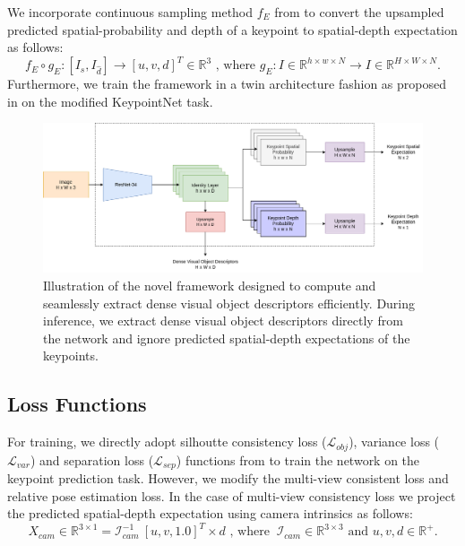 We incorporate continuous sampling method $f_E$ from \parencites{florence2020dense}{suwajanakorn2018discovery}
to convert the upsampled predicted spatial-probability and depth of a keypoint to spatial-depth expectation as follows:
\begin{equation}
    f_E \circ g_E:[I_s, I_{\hat{d}}] \rightarrow [u, v, d]^T \in \mathbb{R}^3 \text{ , where }  g_E: I \in \mathbb{R}^{h \times w \times N} \rightarrow I \in \mathbb{R}^{H \times W \times N}.
\end{equation}
Furthermore, we train the framework in a twin architecture fashion as proposed in
\parencites{chen2020simple}{zbontar2021barlow}{florence2018dense}{florence2020dense}{kupcsik2021supervised}{adrian2022efficient}{hadjivelichkov2021fully}{nerf-Supervision}
on the modified KeypointNet task.

\begin{figure}[htb]
    \centering
    \includegraphics[scale=0.34]{images/arch.png}
    \caption{Illustration of the novel framework designed to compute and seamlessly extract dense visual object descriptors efficiently.
        During inference, we extract dense visual object descriptors directly from the network and ignore predicted spatial-depth expectations of the keypoints.}
    \label{fig:modified_dnn}
\end{figure}


\subsection{Loss Functions}

For training, we directly adopt silhoutte consistency loss ($\mathcal{L}_{obj}$), variance loss ($\mathcal{L}_{var}$) and separation loss ($\mathcal{L}_{sep}$) functions from \cite{suwajanakorn2018discovery} to train the network on the keypoint prediction task.
However, we modify the multi-view consistent loss and relative pose estimation loss. In the case of multi-view consistency loss we
project the predicted spatial-depth expectation using camera intrinsics as follows:
\begin{equation}
    X_{cam} \in \mathbb{R}^{3 \times 1} = \mathcal{I}_{cam}^{-1}  \ [u, v, 1.0]^T \times d \text{ , where  } \ \mathcal{I}_{cam} \in \mathbb{R}^{3 \times 3} \text{ and }  u, v, d \in \mathbb{R}^+.
\end{equation}

